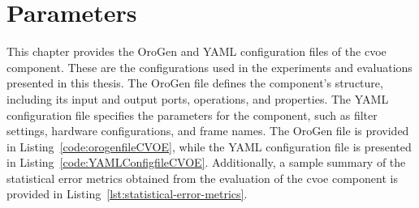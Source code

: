 \documentclass[report.tex]{subfiles}
\begin{document}
    \chapter{Parameters}

    This chapter provides the OroGen and YAML configuration files of the \gls{cvoe} component. These are the configurations used in the experiments and evaluations presented in this thesis. The OroGen file defines the component's structure, including its input and output ports, operations, and properties. The YAML configuration file specifies the parameters for the component, such as filter settings, hardware configurations, and frame names. The OroGen file is provided in Listing~\ref{code:orogenfileCVOE}, while the YAML configuration file is presented in Listing~\ref{code:YAMLConfigfileCVOE}. Additionally, a sample summary of the statistical error metrics obtained from the evaluation of the \gls{cvoe} component is provided in Listing~\ref{lst:statistical-error-metrics}.
    
    

    
        
\end{document}
